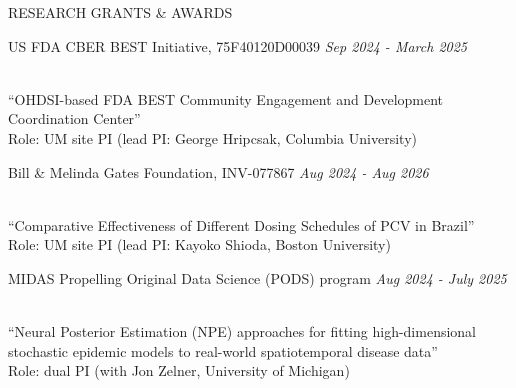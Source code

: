 \documentclass{resume} %
\newcommand{\thisYear}[1]{
	#1
}
\begin{document}
\begin{rSection}{RESEARCH GRANTS \& AWARDS}
	

	\hspace*{-0.25in} 
	\thisYear{
	US FDA CBER BEST Initiative,  75F40120D00039    \hfill{\em Sep 2024 - March 2025}
} \\
	``OHDSI-based FDA BEST Community Engagement and Development Coordination Center'' \\
	Role: UM site PI (lead PI: George Hripcsak, Columbia University)
	\medskip 
	
	\hspace*{-0.25in} 
		\thisYear{Bill \& Melinda Gates Foundation, INV-077867     \hfill{\em Aug 2024 - Aug 2026}
		}
			 \\
	``Comparative Effectiveness of Different Dosing Schedules of PCV in Brazil'' \\
	Role: UM site PI (lead PI: Kayoko Shioda, Boston University)
	
		\medskip 
	
	\hspace*{-0.25in} 
	\thisYear{
	MIDAS Propelling Original Data Science (PODS) program \hfill{\em Aug 2024 - July 2025} }
	\\
	``Neural Posterior Estimation (NPE) approaches for fitting high-dimensional stochastic epidemic models to real-world spatiotemporal disease data'' \\
	Role: dual PI (with Jon Zelner, University of Michigan)
	
\end{rSection}


\end{document}
